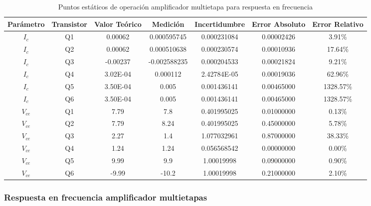 \begin{table}[h!]
\centering
\begin{tabular}{|c|c|c|c|c|c|c|}
\hline
\textbf{Parámetro} & \textbf{Transistor} & \textbf{Valor Teórico} & \textbf{Medición} & \textbf{Incertidumbre} & \textbf{Error Absoluto} & \textbf{Error Relativo} \\ \hline
$I_{c}$ & Q1 & 0.00062 & 0.000595745 & 0.000231084 & 0.00002426 & 3.91\% \\ \hline
$I_{c}$ & Q2 & 0.00062 & 0.000510638 & 0.000230574 & 0.00010936 & 17.64\% \\ \hline
$I_{c}$ & Q3 & -0.00237 & -0.002588235 & 0.000204533 & 0.00021824 & 9.21\% \\ \hline
$I_{c}$ & Q4 & 3.02E-04 & 0.000112 & 2.42784E-05 & 0.00019036 & 62.96\% \\ \hline
$I_{c}$ & Q5 & 3.50E-04 & 0.005 & 0.001436141 & 0.00465000 & 1328.57\% \\ \hline
$I_{c}$ & Q6 & 3.50E-04 & 0.005 & 0.001436141 & 0.00465000 & 1328.57\% \\ \hline
$V_{ce}$ & Q1 & 7.79 & 7.8 & 0.401995025 & 0.01000000 & 0.13\% \\ \hline
$V_{ce}$ & Q2 & 7.79 & 8.24 & 0.401995025 & 0.45000000 & 5.78\% \\ \hline
$V_{ce}$ & Q3 & 2.27 & 1.4 & 1.077032961 & 0.87000000 & 38.33\% \\ \hline
$V_{ce}$ & Q4 & 1.24 & 1.24 & 0.056568542 & 0.00000000 & 0.00\% \\ \hline
$V_{ce}$ & Q5 & 9.99 & 9.9 & 1.00019998 & 0.09000000 & 0.90\% \\ \hline
$V_{ce}$ & Q6 & -9.99 & -10.2 & 1.00019998 & 0.21000000 & 2.10\% \\ \hline
\end{tabular}
\caption{Puntos estáticos de operación amplificador multietapa para respuesta en frecuencia}
\label{tab:med-puntos-estaticos-operacion-amplificador-multietapa-respuesta-frecuencia}
\end{table}


\subsubsection{Respuesta en frecuencia amplificador multietapas}

